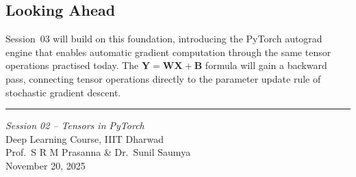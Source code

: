 \documentclass[12pt,a4paper]{article}
\begin{document}
\subsection*{Looking Ahead}

Session~03 will build on this foundation, introducing the PyTorch autograd
engine that enables automatic gradient computation through the same tensor
operations practised today. The $\mathbf{Y} = \mathbf{W}\mathbf{X} + \mathbf{B}$
formula will gain a backward pass, connecting tensor operations directly to
the parameter update rule of stochastic gradient descent.

\vspace{1cm}
\hrule
\vspace{0.5cm}
\begin{center}
  \small
  \textit{Session 02 -- Tensors in PyTorch} \\
  Deep Learning Course, IIIT Dharwad \\
  Prof.\ S R M Prasanna \& Dr.\ Sunil Saumya \\
  November 20, 2025
\end{center}

\clearpage
\end{document}
